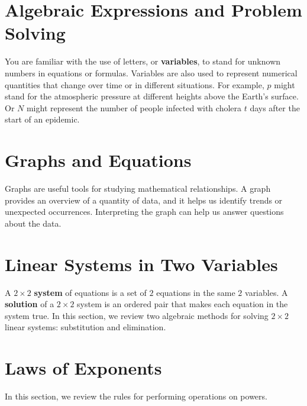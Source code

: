 \documentclass[10pt,]{book}
\newcommand{\terminology}[1]{\textbf{#1}}
\theoremstyle{plain}
\theoremstyle{definition}
\theoremstyle{definition}
\theoremstyle{definition}
\theoremstyle{definition}
\numberwithin{equation}{section}
\begin{document}
\section[Algebraic Expressions and Problem Solving]{Algebraic Expressions and Problem Solving}\label{appendix-Algebraic-Expressions-and-Problem-Solving}
You are familiar with the use of letters, or \terminology{variables}, to stand for unknown numbers in equations or formulas. Variables are also used to represent numerical quantities that change over time or in different situations. For example, \(p\) might stand for the atmospheric pressure at different heights above the Earth's surface. Or \(N\) might represent the number of people infected with cholera \(t\) days after the start of an epidemic.%
\typeout{************************************************}
\typeout{************************************************}
\section[Graphs and Equations]{Graphs and Equations}\label{appendix-Graphs-and-Equations}
Graphs are useful tools for studying mathematical relationships. A graph provides an overview of a quantity of data, and it helps us identify trends or unexpected occurrences. Interpreting the graph can help us answer questions about the data.%
\typeout{************************************************}
\typeout{************************************************}
\section[Linear Systems in Two Variables]{Linear Systems in Two Variables}\label{appendix-Linear-Systems-in-Two-Variables}
\index{}A \(2\times 2\) \terminology{system} of equations is a set of \(2\) equations in the same \(2\) variables. A \terminology{solution} of a \(2\times 2\) system is an ordered pair that makes each equation in the system true. In this section, we review two algebraic methods for solving \(2\times 2\) linear systems: substitution and elimination.%
\typeout{************************************************}
\typeout{************************************************}
\section[Laws of Exponents]{Laws of Exponents}\label{appendix-Laws-of-Exponents}
\index{}In this section, we review the rules for performing operations on powers.%
\typeout{************************************************}
\typeout{************************************************}
\end{document}
